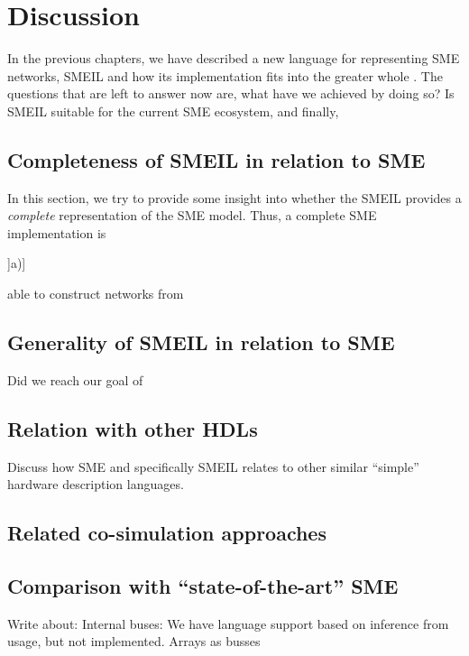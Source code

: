 \chapter{Discussion}

In the previous chapters, we have described a new language for representing SME
networks, SMEIL and how its implementation fits into the greater whole
. The questions that are left to answer now are, what have we
achieved by doing so? Is SMEIL suitable for the current SME ecosystem, and
finally, 

\section{Completeness of SMEIL in relation to SME}
In this section, we try to provide some insight into whether the SMEIL provides
a {\itshape complete} representation of the SME model. Thus, a complete SME
implementation is \begin{inparaenum}]a)] \item able to construct networks from 
\end{inparaenum}

\section{Generality of SMEIL in relation to SME}
Did we reach our goal of


\section{Relation with other HDLs}
Discuss how SME and specifically SMEIL relates to other similar ``simple''
hardware description languages. 

\section{Related co-simulation approaches}

\section{Comparison with ``state-of-the-art'' SME}
Write about: Internal buses: We have language support based on inference from
usage, but not implemented. Arrays as busses


